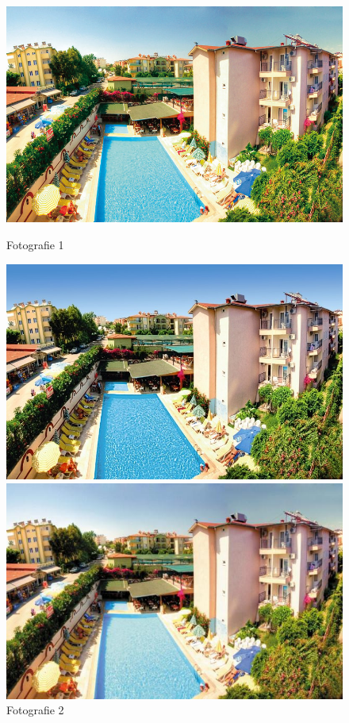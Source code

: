 \begin{figure}[!htb]
	\includegraphics[width=\linewidth]{graphics/kop/aa01.png}
	\caption{Fotografie 1}\label{fig:img01}
	\endminipage\hfill
	\includegraphics[width=\linewidth]{graphics/kop/aa02.png}
	\caption{Fotografie 2}\label{fig:img02}
	\endminipage\hfill
	\includegraphics[width=\linewidth]{graphics/kop/aa03.png}

\end{figure}
